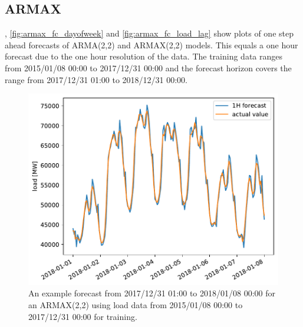 \subsection*{ARMAX}

, \cref{fig:armax_fc_dayofweek} and \cref{fig:armax_fc_load_lag} show plots of one step ahead forecasts of ARMA(2,2) and ARMAX(2,2) models. This equals a one hour forecast due to the one hour resolution of the data. The training data ranges from 2015/01/08 00:00 to 2017/12/31 00:00 and the forecast horizon covers the range from 2017/12/31 01:00 to 2018/12/31 00:00.\\

\begin{figure}[h!]%
\centering
\includegraphics[width=\textwidth]{plots/ARMAXfc/ARMAX_p2q2_data2015to2017_fcto2018123100_plot_range2018010100_2018010800}%
\caption{An example forecast from 2017/12/31 01:00 to 2018/01/08 00:00 for an ARMAX(2,2) using load data from 2015/01/08 00:00 to 2017/12/31 00:00 for training.}%
\label{fig:armax_fc}%
\end{figure}

